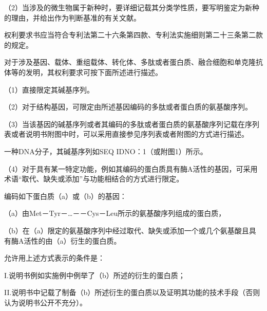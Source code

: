 {\setlength{\parindent}{16.5bp}（2）当涉及的微生物属于新种时，要详细记载其分类学性质，要写明鉴定为新种的理由，并给出作为判断基准的有关文献。\par}

权利要求书应当符合专利法第二十六条第四款、专利法实施细则第二十三条第二款的规定。

对于涉及基因、载体、重组载体、转化体、多肽或者蛋白质、融合细胞和单克隆抗体等的发明，其权利要求可按下面所述进行描述。

{\setlength{\parindent}{17.1bp}（1）直接限定其碱基序列。\par}

{\setlength{\parindent}{17.1bp}（2）对于结构基因，可限定由所述基因编码的多肽或者蛋白质的氨基酸序列。\par}

{\setlength{\parindent}{17.1bp}（3）当该基因的碱基序列或者其编码的多肽或者蛋白质的氨基酸序列记载在序列表或者说明书附图中时，可以采用直接参见序列表或者附图的方式进行描述。\par}

{\par}

一种DNA分子，其碱基序列如SEQ IDNO：1（或附图1）所示。

{\setlength{\parindent}{17.1bp}（4）对于具有某一特定功能，例如其编码的蛋白质具有酶A活性的基因，可采用术语“取代、缺失或添加”与功能相结合的方式进行限定。\par}

{\par}

编码如下蛋白质（a）或（b）的基因：

{\setlength{\parindent}{17.1bp}（a）由Met－Tyr－…－－Cys－Leu所示的氨基酸序列组成的蛋白质，\par}

{\setlength{\parindent}{17.1bp}（b）在（a）限定的氨基酸序列中经过取代、缺失或添加一个或几个氨基酸且具有酶A活性的由（a）衍生的蛋白质。\par}

允许用上述方式表示的条件是：

I.说明书例如实施例中例举了（b）所述的衍生的蛋白质；

II.说明书中记载了制备（b）所述衍生的蛋白质以及证明其功能的技术手段（否则认为说明书公开不充分）。

